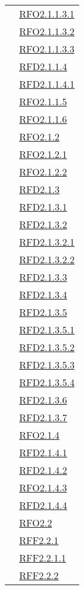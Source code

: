 \begin{longtable}{|>{\centering}m{5cm}|m{5cm}<{\centering}|}
& \hyperlink{RFO2.1.1.3.1}{RFO2.1.1.3.1}\\
& \hyperlink{RFO2.1.1.3.2}{RFO2.1.1.3.2}\\
& \hyperlink{RFO2.1.1.3.3}{RFO2.1.1.3.3}\\
& \hyperlink{RFD2.1.1.4}{RFD2.1.1.4}\\
& \hyperlink{RFD2.1.1.4.1}{RFD2.1.1.4.1}\\
& \hyperlink{RFO2.1.1.5}{RFO2.1.1.5}\\
& \hyperlink{RFO2.1.1.6}{RFO2.1.1.6}\\
& \hyperlink{RFO2.1.2}{RFO2.1.2}\\
& \hyperlink{RFO2.1.2.1}{RFO2.1.2.1}\\
& \hyperlink{RFO2.1.2.2}{RFO2.1.2.2}\\
& \hyperlink{RFD2.1.3}{RFD2.1.3}\\
& \hyperlink{RFD2.1.3.1}{RFD2.1.3.1}\\
& \hyperlink{RFD2.1.3.2}{RFD2.1.3.2}\\
& \hyperlink{RFD2.1.3.2.1}{RFD2.1.3.2.1}\\
& \hyperlink{RFD2.1.3.2.2}{RFD2.1.3.2.2}\\
& \hyperlink{RFD2.1.3.3}{RFD2.1.3.3}\\
& \hyperlink{RFD2.1.3.4}{RFD2.1.3.4}\\
& \hyperlink{RFD2.1.3.5}{RFD2.1.3.5}\\
& \hyperlink{RFD2.1.3.5.1}{RFD2.1.3.5.1}\\
& \hyperlink{RFD2.1.3.5.2}{RFD2.1.3.5.2}\\
& \hyperlink{RFD2.1.3.5.3}{RFD2.1.3.5.3}\\
& \hyperlink{RFD2.1.3.5.4}{RFD2.1.3.5.4}\\
& \hyperlink{RFD2.1.3.6}{RFD2.1.3.6}\\
& \hyperlink{RFD2.1.3.7}{RFD2.1.3.7}\\
& \hyperlink{RFO2.1.4}{RFO2.1.4}\\
& \hyperlink{RFD2.1.4.1}{RFD2.1.4.1}\\
& \hyperlink{RFD2.1.4.2}{RFD2.1.4.2}\\
& \hyperlink{RFO2.1.4.3}{RFO2.1.4.3}\\
& \hyperlink{RFD2.1.4.4}{RFD2.1.4.4}\\
& \hyperlink{RFO2.2}{RFO2.2}\\
& \hyperlink{RFF2.2.1}{RFF2.2.1}\\
& \hyperlink{RFF2.2.1.1}{RFF2.2.1.1}\\
& \hyperlink{RFF2.2.2}{RFF2.2.2}\\

\end{longtable}
